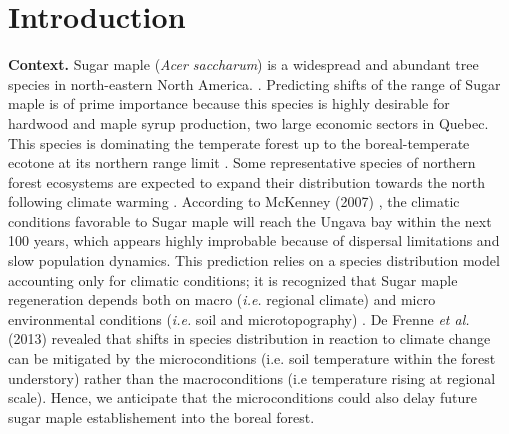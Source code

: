 


\newpage
\setcounter{page}{1}

\section{Introduction}

\textbf{Context.} Sugar maple (\textit{Acer saccharum}) is a widespread and
abundant tree species in north-eastern North America.
\cite{Graignic2013,Messaoud2007,Kellman2004,Barras1998}. Predicting shifts of
the range of Sugar maple is of prime importance because this species is highly
desirable for hardwood and maple syrup production, two large economic sectors
in Quebec. This species is dominating the temperate forest up to the boreal-temperate 
ecotone at its northern range limit \cite{Barras1998}. Some
representative species of northern forest ecosystems are expected to expand
their distribution towards the north following climate warming
\cite{Sciences2014,Iverson2002}. According to McKenney (2007)
\cite{Sciences2014}, the climatic conditions  favorable to Sugar maple  will
reach the Ungava bay within the next 100 years, which appears highly
improbable because of dispersal limitations and slow population dynamics. This
prediction relies on a species distribution model accounting only for climatic
conditions; it is recognized that Sugar maple regeneration depends both on
macro  (\textit{i.e.} regional climate) and micro environmental conditions
(\textit{i.e.} soil and microtopography) \cite{Graignic2013,Lafleur2010}. De
Frenne \textit{et al.} (2013) revealed that shifts in species distribution in
reaction to climate change can be mitigated by the microconditions (i.e. soil
temperature within the forest understory) rather than the macroconditions (i.e
temperature rising at regional scale). Hence, we anticipate that the microconditions could also delay future sugar maple establishement into the boreal
forest.\\

